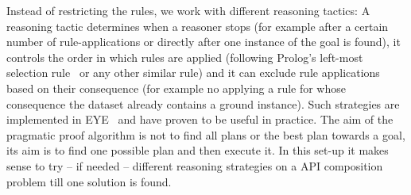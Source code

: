 Instead of restricting the rules, we work with different reasoning tactics: A reasoning tactic determines when a reasoner stops 
(for example after a certain number of rule-applications  
or directly after one instance of the goal is found), it controls the order in which rules are applied 
(following Prolog's left-most selection rule~\cite{nilsson} or any other similar rule) and it can exclude rule applications based on their consequence (for example 
no applying a rule for whose consequence the dataset already contains a ground instance). Such strategies are implemented in EYE~\cite{eye} and have proven 
to be useful in practice. 
The aim of the pragmatic proof algorithm is not to find all plans or the best plan towards a goal, its aim is to find one possible plan and then execute it.
In this set-up it makes sense to try -- if needed -- different reasoning strategies on a API composition problem till one solution is found.



% 
% 
% 
% 
% 
% 
% 
% 
% 
% 
% 
% 
% 
% 
% 


